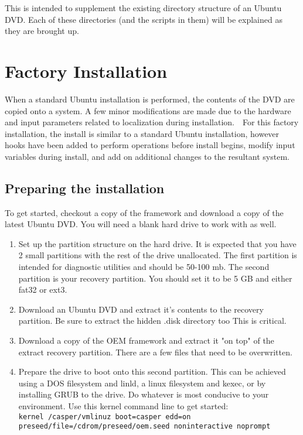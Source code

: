 \documentclass[letterpaper,10pt,titlepage]{article}
\begin{document}
This is intended to supplement the existing directory structure of an Ubuntu DVD.  Each of these directories (and the scripts in them) will be explained as they are brought up.

\section{Factory Installation}
When a standard Ubuntu installation is performed, the contents of the DVD are copied onto a system.  A few minor modifications are made due to the hardware and input parameters related to localization during installation.\
\
For this factory installation, the install is similar to a standard Ubuntu installation, however hooks have been added to perform operations before install begins, modify input variables during install, and add on additional changes to the resultant system.

\subsection{Preparing the installation}
To get started, checkout a copy of the framework and download a copy of the latest Ubuntu DVD.  You will need a blank hard drive to work with as well.
\begin{enumerate}{}
\item Set up the partition structure on the hard drive.  It is expected that you have 2 small partitions with the rest of the drive unallocated.  The first partition is intended for diagnostic utilities and should be 50-100 mb.  The second partition is your recovery partition.  You should set it to be 5 GB and either fat32 or ext3.
\item Download an Ubuntu DVD and extract it's contents to the recovery partition.  Be sure to extract the hidden .disk directory too   This is critical.
\item Download a copy of the OEM framework and extract it "on top" of the extract recovery partition.  There are a few files that need to be overwritten.
\item Prepare the drive to boot onto this second partition.  This can be achieved using a DOS filesystem and linld, a linux filesystem and kexec, or by installing GRUB to the drive.  Do whatever is most conducive to your environment.  Use this kernel command line to get started:
\\
\texttt{kernel /casper/vmlinuz boot=casper edd=on preseed/file=/cdrom/preseed/oem.seed noninteractive noprompt}
\end{enumerate}
\end{document}
